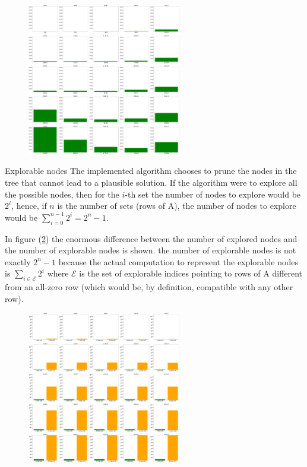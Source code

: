 \documentclass{beamer}
\begin{document}
\begin{frame}
    \begin{figure}
        \centering
        \includegraphics[width=0.6\textwidth]{explored_5x5.pdf}
        \label{fig:explored_5x5}
    \end{figure}
\end{frame}

\begin{frame}{Explorable nodes}
    The implemented algorithm chooses to prune the nodes in the tree
    that cannot lead to a plausible solution.
    If the algorithm were to explore all the possible nodes, then for the 
    $i$-th set the number of nodes to explore would be $2^i$,
    hence, if $n$ is the number of sets (rows of A),
    the number of nodes to explore would be $\sum_{i=0}^{n-1} 2^i = 2^n - 1$.

    In figure (\ref{fig:explored_vs_explorable_5x5}) the enormous difference
    between the number of explored nodes and the number of explorable nodes is shown.
    the number of explorable nodes is not exactly $2^n - 1$ because
    the actual computation to represent the explorable nodes is 
    $\sum_{i\in\mathcal{E}}2^i$ where $\mathcal{E}$ is the set of
    explorable  indices
    pointing to rows of A different from an all-zero row (which would be,
    by definition, compatible with any other row).
\end{frame}

\begin{frame}
    \begin{figure}
        \centering
        \includegraphics[width=0.6\textwidth]{explored_vs_explorable_5x5.pdf}
        \label{fig:explored_vs_explorable_5x5}
    \end{figure}
\end{frame}
\end{document}
